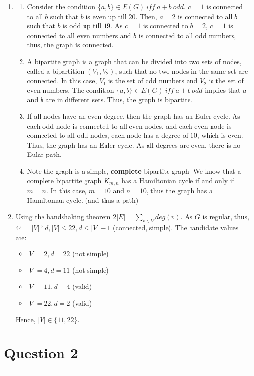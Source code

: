 \documentclass{article}
\begin{document}
\begin{enumerate}[label=(\alph*)]
    \item
          \begin{enumerate}[label=(\roman*)]
              \item  Consider the condition $\{a,b\} \in E(G)\ iff\ a+b\ odd$. $a=1$ is connected to all $b$ such that $b$ is even up till $20$. Then, $a=2$ is connected to all $b$ such that $b$ is odd up till $19$. As $a=1$ is connected to $b=2$, $a=1$ is connected to all even numbers and $b$ is connected to all odd numbers, thus, the graph is connected.
              \item A bipartite graph is a graph that can be divided into two sets of nodes, called a bipartition $(V_1, V_2)$, such that no two nodes in the same set are connected. In this case, $V_1$ is the set of odd numbers and $V_2$ is the set of even numbers. The condition $\{a,b\} \in E(G)\ iff\ a+b\ odd$ implies that $a$ and $b$ are in different sets. Thus, the graph is bipartite.
              \item If all nodes have an even degree, then the graph has an Euler cycle. As each odd node is connected to all even nodes, and each even node is connected to all odd nodes, each node has a degree of $10$, which is even. Thus, the graph has an Euler cycle. As all degrees are even, there is no Eular path.
              \item Note the graph is a simple, \textbf{complete} bipartite graph. We know that a complete bipartite graph $K_{m,n}$ has a Hamiltonian cycle if and only if $m=n$. In this case, $m=10$ and $n=10$, thus the graph has a Hamiltonian cycle. (and thus a path)
          \end{enumerate}
    \item Using the handshaking theorem $2|E|=\sum_{v\in V}deg(v)$. As $G$ is regular, thus, $44=|V|*d, |V| \leq 22, d \leq |V| - 1$ (connected, simple). The candidate values are:
          \begin{itemize}
              \item $|V|=2, d=22$ (not simple)
              \item $|V|=4, d=11$ (not simple)
              \item $|V|=11, d=4$ (valid)
              \item $|V|=22, d=2$ (valid)
          \end{itemize}
          Hence, $|V| \in \{11, 22\}$.
\end{enumerate}

\section*{Question 2}
\hrule
\vspace{0.5cm}
\end{document}
